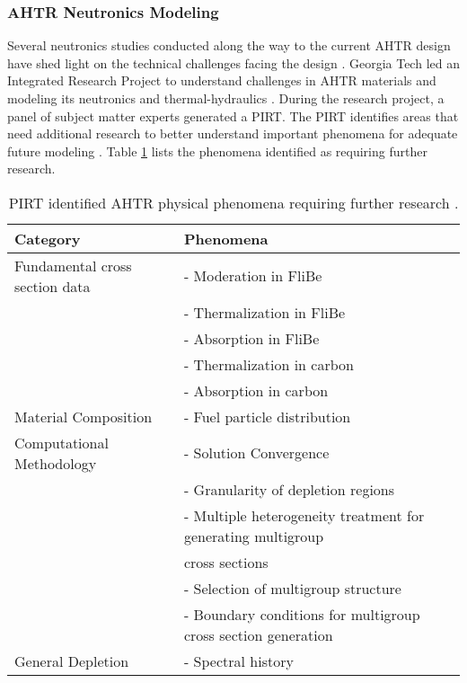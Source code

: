 \subsubsection{AHTR Neutronics Modeling}
Several neutronics studies conducted along the way to the current \gls{AHTR} 
design have shed light on the technical challenges facing the design 
\cite{ramey_monte_2018,holcomb_fluoride_2013,greene_pre-conceptual_2010}. 
\gls{Georgia Tech} led an Integrated Research Project to 
understand challenges in \gls{AHTR} materials and modeling its neutronics and 
thermal-hydraulics \cite{zhang_integrated_2019}. 
During the research project, a panel of subject matter experts 
generated a \gls{PIRT}.
The \gls{PIRT} identifies areas that need additional research to better 
understand important phenomena for adequate future modeling
\cite{rahnema_phenomena_2019}. 
Table \ref{tab:phenomena} lists the phenomena identified as requiring further 
research. 
\begin{table}[btp]
    \centering
    \onehalfspacing
    \caption{\acrlong{PIRT} identified \acrlong{AHTR} physical phenomena requiring 
    further research \cite{rahnema_phenomena_2019}.}
	\label{tab:phenomena}
    \footnotesize
    \begin{tabular}{l|l}
    \hline
    \textbf{Category} & \textbf{Phenomena} \\ \hline
    Fundamental cross section data & - Moderation in FliBe \\
    & - Thermalization in FliBe \\
    & - Absorption in FliBe \\
    & - Thermalization in carbon \\
    & - Absorption in carbon \\ \hline
    Material Composition & - Fuel particle distribution \\ \hline
    Computational Methodology & - Solution Convergence \\ 
    & - Granularity of depletion regions \\
    & - Multiple heterogeneity treatment for generating multigroup \\ 
    & cross sections \\
    & - Selection of multigroup structure \\
    & - Boundary conditions for multigroup cross section generation \\ \hline 
    General Depletion & - Spectral history \\ \hline 
    \end{tabular}
\end{table}


